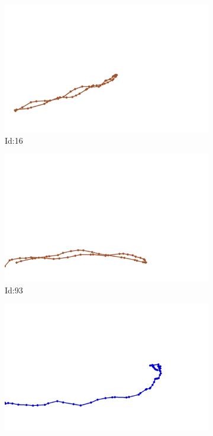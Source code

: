 \documentclass[12pt,twoside]{report}
\begin{document}
\begin{figure}
\centering
\begin{subfigure}[b]{0.20\textwidth}
\centering
\includegraphics[width=\textwidth]{../trajectories/16.png}
\caption{Id:16}
\end{subfigure}
\begin{subfigure}[b]{0.20\textwidth}
\centering
\includegraphics[width=\textwidth]{../trajectories/93.png}
\caption{Id:93}
\end{subfigure}
\begin{subfigure}[b]{0.20\textwidth}
\centering
\includegraphics[width=\textwidth]{../trajectories/263.png}

\end{subfigure}
\end{figure}
\end{document}
